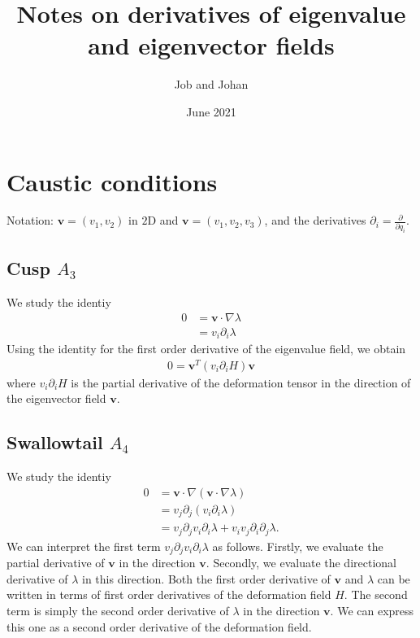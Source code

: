 \documentclass{article}
\title{Notes on derivatives of eigenvalue and eigenvector fields}
\author{Job and Johan}
\date{June 2021}
\begin{document}
\maketitle

\section{Caustic conditions}
Notation: $\bm{v}=(v_1,v_2)$ in $2$D and $\bm{v}=(v_1,v_2,v_3)$, and the derivatives $\partial_i = \frac{\partial}{\partial q_i}$.

\subsection{Cusp $A_3$}
We study the identiy
\begin{align}
0
&= \bm{v} \cdot \nabla \lambda\\
&= v_i \partial_i \lambda
\end{align}
Using the identity for the first order derivative of the eigenvalue field, we obtain 
\begin{align}
0= \bm{v}^T  (v_i \partial_i H)\bm{v}
\end{align}
where $v_i \partial_i H$ is the partial derivative of the deformation tensor in the direction of the eigenvector field $\bm{v}$.

\subsection{Swallowtail $A_4$}
We study the identiy
\begin{align}
0
&= \bm{v} \cdot \nabla (\bm{v} \cdot \nabla \lambda)\\
&= v_j \partial_j(v_i \partial_i \lambda)\\
&= v_j \partial_j v_i \partial_i \lambda + v_i v_j   \partial_i \partial_j \lambda.
\end{align}
We can interpret the first term $v_j \partial_j v_i \partial_i \lambda $ as follows. Firstly, we evaluate the partial derivative of $\bm{v}$ in the direction $\bm{v}$. Secondly, we evaluate the directional derivative of $\lambda$ in this direction. Both the first order derivative of $\bm{v}$ and $\lambda$ can be written in terms of first order derivatives of the deformation field $H$. The second term is simply the second order derivative of $\lambda$ in the direction $\bm{v}$. We can express this one as a second order derivative of the deformation field.
\end{document}
